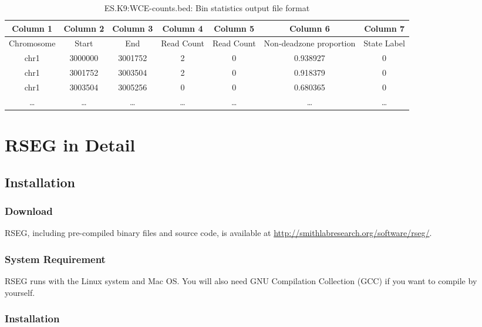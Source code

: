 \documentclass[11pt]{report}
\begin{document}
\begin{table}[th]
  \centering
  \begin{tabular}{c c c c c c c }
    Column 1 & Column 2 & Column 3 &  Column 4 & Column 5 &  Column 6
    & Column 7\\
    \hline
    Chromosome  & Start & End & Read Count & Read Count & Non-deadzone proportion &
    State Label \\
    \hline
chr1&    3000000& 3001752& 2&       0&       0.938927&        0\\
chr1&    3001752& 3003504& 2&       0&       0.918379&        0\\
chr1&    3003504& 3005256& 0&       0&       0.680365&        0\\
    \ldots & \ldots &\ldots &\ldots &\ldots &\ldots & \ldots \\ 
    \hline
  \end{tabular}
  \caption{ES.K9:WCE-counts.bed: Bin statistics output file format}
  \label{tab:format-bin-diff}
\end{table}


\chapter{RSEG in Detail}
\label{chap:rseg-manual}

\section{Installation}
\label{sec:install}

\subsection*{Download}

RSEG, including pre-compiled binary files and source code, is
available at \url{http://smithlabresearch.org/software/rseg/}.

\subsection*{System Requirement}

RSEG runs with the Linux system and Mac OS. You will also need GNU
Compilation Collection (GCC) if you want to compile by yourself.

\subsection*{Installation}
\end{document}
